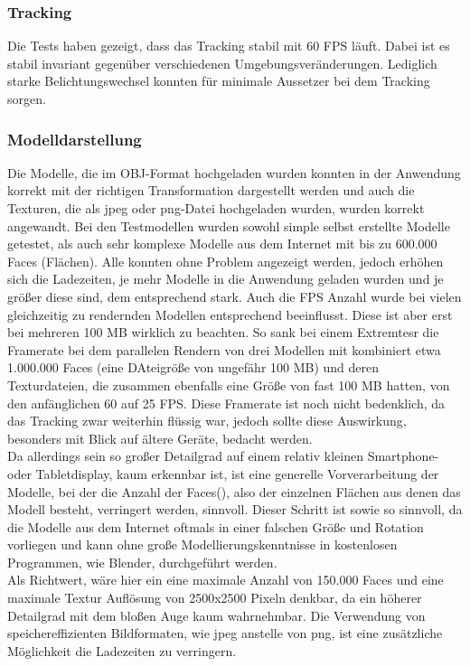 \subsubsection{Tracking}
Die Tests haben gezeigt, dass das Tracking stabil mit 60 FPS läuft. Dabei ist es stabil invariant gegenüber verschiedenen Umgebungsveränderungen. Lediglich starke Belichtungswechsel konnten für minimale Aussetzer bei dem Tracking sorgen.

\subsubsection{Modelldarstellung}
Die Modelle, die im OBJ-Format hochgeladen wurden konnten in der Anwendung korrekt mit der richtigen Transformation dargestellt werden und auch die Texturen, die als jpeg oder png-Datei hochgeladen wurden, wurden korrekt angewandt. Bei den Testmodellen wurden sowohl simple selbst erstellte Modelle getestet, als auch sehr komplexe Modelle aus dem Internet mit bis zu 600.000 Faces (Flächen). Alle konnten ohne Problem angezeigt werden, jedoch erhöhen sich die Ladezeiten, je mehr Modelle in die Anwendung geladen wurden und je größer diese sind, dem entsprechend stark. Auch die FPS Anzahl wurde bei vielen gleichzeitig zu rendernden Modellen entsprechend beeinflusst. Diese ist aber erst bei mehreren 100 MB wirklich zu beachten. So sank bei einem Extremtesr die Framerate bei dem parallelen Rendern von drei Modellen mit kombiniert etwa 1.000.000 Faces  (eine DAteigröße von ungefähr 100 MB) und deren Texturdateien, die zusammen ebenfalls eine Größe von fast 100 MB hatten, von den anfänglichen 60 auf 25 FPS. Diese Framerate ist noch nicht bedenklich, da das Tracking zwar weiterhin flüssig war, jedoch sollte diese Auswirkung, besonders mit Blick  auf ältere Geräte, bedacht werden. \\
Da allerdings sein so großer Detailgrad auf einem relativ kleinen Smartphone- oder Tabletdisplay, kaum erkennbar ist, ist eine generelle Vorverarbeitung der Modelle, bei der die Anzahl der Faces(), also der einzelnen Flächen aus denen das Modell besteht, verringert werden, sinnvoll. Dieser Schritt ist sowie so sinnvoll, da die Modelle aus dem Internet oftmals in einer falschen Größe und Rotation vorliegen und kann ohne große Modellierungskenntnisse in kostenlosen Programmen, wie Blender, durchgeführt werden.\\
Als Richtwert, wäre hier ein eine maximale Anzahl von 150.000 Faces und eine maximale Textur Auflösung von 2500x2500 Pixeln denkbar, da ein höherer Detailgrad mit dem bloßen Auge kaum wahrnehmbar. Die Verwendung von speichereffizienten Bildformaten, wie jpeg anstelle von png, ist eine zusätzliche Möglichkeit die Ladezeiten zu verringern.


